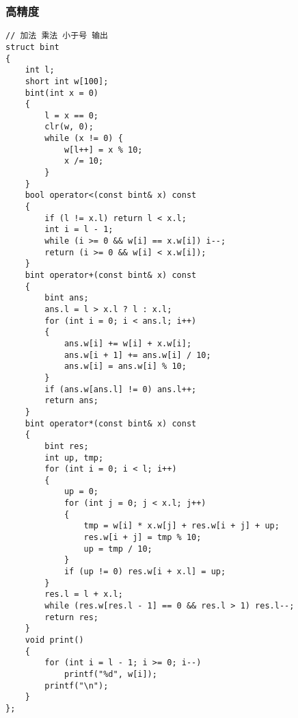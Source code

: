 \documentclass[a4]{article}
\begin{document}
\subsubsection{高精度}
\begin{lstlisting}
// 加法 乘法 小于号 输出
struct bint
{
    int l;
    short int w[100];
    bint(int x = 0)
    {
        l = x == 0;
        clr(w, 0);
        while (x != 0) {
            w[l++] = x % 10;
            x /= 10;
        }
    }
    bool operator<(const bint& x) const
    {
        if (l != x.l) return l < x.l;
        int i = l - 1;
        while (i >= 0 && w[i] == x.w[i]) i--;
        return (i >= 0 && w[i] < x.w[i]);
    }
    bint operator+(const bint& x) const
    {
        bint ans;
        ans.l = l > x.l ? l : x.l;
        for (int i = 0; i < ans.l; i++)
        {
            ans.w[i] += w[i] + x.w[i];
            ans.w[i + 1] += ans.w[i] / 10;
            ans.w[i] = ans.w[i] % 10;
        }
        if (ans.w[ans.l] != 0) ans.l++;
        return ans;
    }
    bint operator*(const bint& x) const
    {
        bint res;
        int up, tmp;
        for (int i = 0; i < l; i++)
        {
            up = 0;
            for (int j = 0; j < x.l; j++)
            {
                tmp = w[i] * x.w[j] + res.w[i + j] + up;
                res.w[i + j] = tmp % 10;
                up = tmp / 10;
            }
            if (up != 0) res.w[i + x.l] = up;
        }
        res.l = l + x.l;
        while (res.w[res.l - 1] == 0 && res.l > 1) res.l--;
        return res;
    }
    void print()
    {
        for (int i = l - 1; i >= 0; i--)
            printf("%d", w[i]);
        printf("\n");
    }
};
\end{lstlisting}
\end{document}

